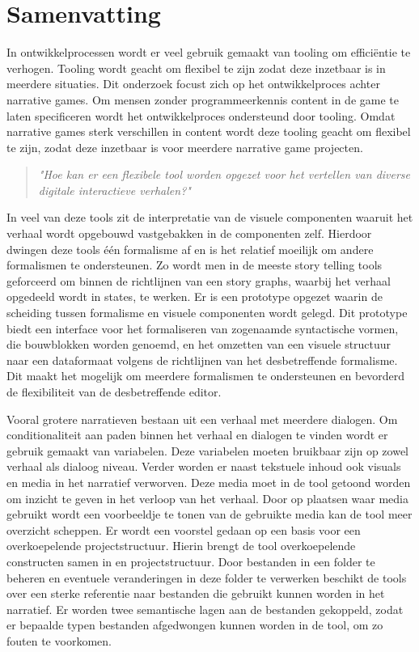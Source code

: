 \chapter*{Samenvatting}
In ontwikkelprocessen wordt er veel gebruik gemaakt van tooling om efficiëntie te verhogen. Tooling wordt geacht om flexibel te zijn zodat deze inzetbaar is in meerdere situaties. Dit onderzoek focust zich op het ontwikkelproces achter narrative games. Om mensen zonder programmeerkennis content in de game te laten specificeren wordt het ontwikkelproces ondersteund door tooling. Omdat narrative games sterk verschillen in content wordt deze tooling geacht om flexibel te zijn, zodat deze inzetbaar is voor meerdere narrative game projecten.
\begin{quote} 
    \centering
    \large
    \textit{
        "Hoe kan er een flexibele tool worden opgezet voor het vertellen van diverse digitale interactieve verhalen?"
    }
\end{quote}

In veel van deze tools zit de interpretatie van de visuele componenten waaruit het verhaal wordt opgebouwd vastgebakken in de componenten zelf. Hierdoor dwingen deze tools één formalisme af en is het relatief moeilijk om andere formalismen te ondersteunen. Zo wordt men in de meeste story telling tools geforceerd om binnen de richtlijnen van een story graphs, waarbij het verhaal opgedeeld wordt in states, te werken. Er is een prototype opgezet waarin de scheiding tussen formalisme en visuele componenten wordt gelegd. Dit prototype biedt een interface voor het formaliseren van zogenaamde syntactische vormen, die bouwblokken worden genoemd, en het omzetten van een visuele structuur naar een dataformaat volgens de richtlijnen van het desbetreffende formalisme. Dit maakt het mogelijk om meerdere formalismen te ondersteunen en bevorderd de flexibiliteit van de desbetreffende editor.

Vooral grotere narratieven bestaan uit een verhaal met meerdere dialogen. Om conditionaliteit aan paden binnen het verhaal en dialogen te vinden wordt er gebruik gemaakt van variabelen. Deze variabelen moeten bruikbaar zijn op zowel verhaal als dialoog niveau. Verder worden er naast tekstuele inhoud ook visuals en media in het narratief verworven. Deze media moet in de tool getoond worden om inzicht te geven in het verloop van het verhaal. Door op plaatsen waar media gebruikt wordt een voorbeeldje te tonen van de gebruikte media kan de tool meer overzicht scheppen. Er wordt een voorstel gedaan op een basis voor een overkoepelende projectstructuur. Hierin brengt de tool overkoepelende constructen samen in en projectstructuur. Door bestanden in een folder te beheren en eventuele veranderingen in deze folder te verwerken beschikt de tools over een sterke referentie naar bestanden die gebruikt kunnen worden in het narratief. Er worden twee semantische lagen aan de bestanden gekoppeld, zodat er bepaalde typen bestanden afgedwongen kunnen worden in de tool, om zo fouten te voorkomen.

